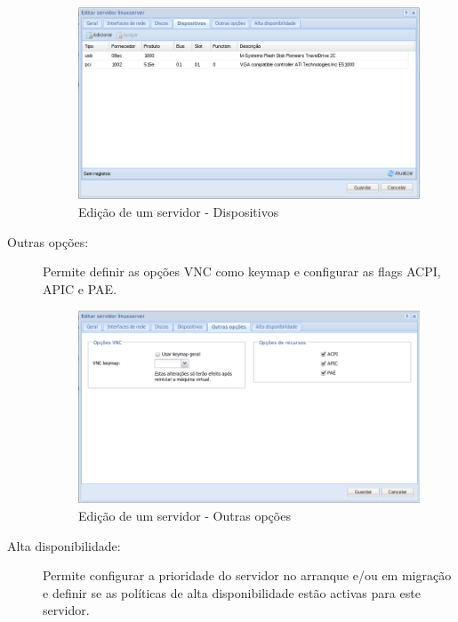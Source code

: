 \begin{description}
		\begin{figure}[H]
        		\begin{center}
		        \includegraphics[scale=0.5]{screenshots/server_edit_devices.png}
        		\caption{Edição de um servidor - Dispositivos}
		        \label{fig:server_edit_devices}
	        	\end{center}
		\end{figure}
      
	\item[Outras opções:] Permite definir as opções VNC como keymap e configurar as flags ACPI, APIC e PAE.

		\begin{figure}[H]
        		\begin{center}
		        \includegraphics[scale=0.5]{screenshots/server_edit_otheroptions.png}
        		\caption{Edição de um servidor - Outras opções}
	        	\label{fig:server_edit_otheroptions}
	        	\end{center}
		\end{figure}

	\item[Alta disponibilidade:] Permite configurar a prioridade do servidor no arranque e/ou em migração e definir se as políticas de alta disponibilidade estão activas para este servidor.


\end{description}
